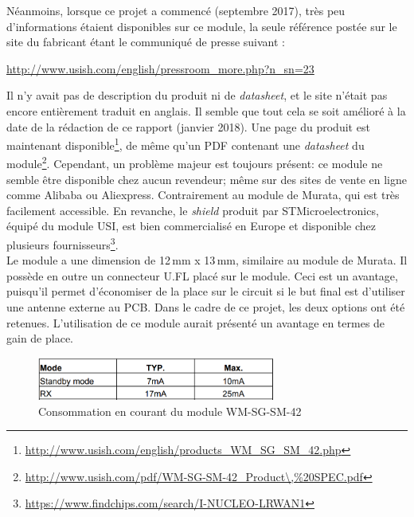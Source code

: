 Néanmoins, lorsque ce projet a commencé (septembre 2017), très peu d'informations étaient disponibles sur ce module, la seule référence postée sur le site du fabricant étant le communiqué de presse suivant : 
\begin{center}
    \url{http://www.usish.com/english/pressroom_more.php?n_sn=23}
\end{center}
Il n'y avait pas de description du produit ni de \textit{datasheet}, et le site n'était pas encore entièrement traduit en anglais. Il semble que tout cela se soit amélioré à la date de la rédaction de ce rapport (janvier 2018). Une page du produit est maintenant disponible\footnote{\url{http://www.usish.com/english/products_WM_SG_SM_42.php}}, de même qu’un PDF contenant une \textit{datasheet} du module\footnote{\url{http://www.usish.com/pdf/WM-SG-SM-42_Product\,\%20SPEC.pdf}}. Cependant, un problème majeur est toujours présent: ce module ne semble être disponible chez aucun revendeur; même sur des sites de vente en ligne comme Alibaba ou Aliexpress. Contrairement au module de Murata, qui est très facilement accessible. En revanche, le \textit{shield} produit par STMicroelectronics, équipé du module USI, est bien commercialisé en Europe et disponible chez plusieurs fournisseurs\footnote{\url{https://www.findchips.com/search/I-NUCLEO-LRWAN1}}.\\


Le module a une dimension de 12\,mm x 13\,mm, similaire au module de Murata. Il possède en outre un connecteur U.FL placé sur le module. Ceci est un avantage, puisqu'il permet d'économiser de la place sur le circuit si le but final est d'utiliser une antenne externe au PCB. Dans le cadre de ce projet, les deux options ont été retenues. L'utilisation de ce module aurait présenté un avantage en termes de gain de place. \\

\begin{figure}[ht!]
    \centering
    \includegraphics[width=0.7\textwidth]{Figures/Hardware/usi_current_consumption.PNG}
    \caption{Consommation en courant du module WM-SG-SM-42}
    \label{fig-usi_current_consumption}
\end{figure}

